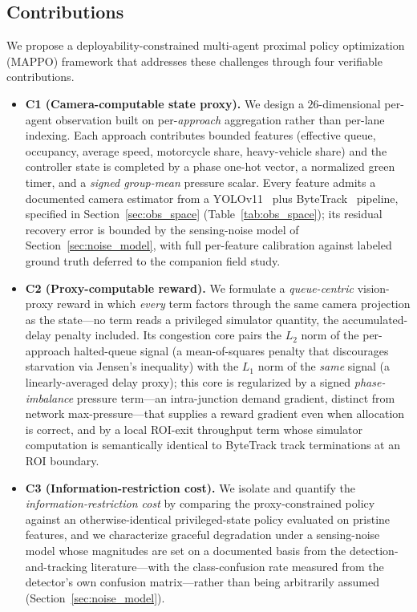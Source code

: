 \subsection{Contributions}
We propose a deployability-constrained multi-agent proximal policy optimization (MAPPO) framework that addresses these challenges through four verifiable contributions.
\begin{itemize}
  \item \textbf{C1 (Camera-computable state proxy).} We design a
  $26$-dimensional per-agent observation built on per-\emph{approach}
  aggregation rather than per-lane indexing. Each approach contributes bounded features (effective queue, occupancy, average speed, motorcycle share, heavy-vehicle share) and the controller state is completed by a phase one-hot vector, a normalized green timer, and a \emph{signed group-mean} pressure scalar. Every feature admits a documented camera estimator from a YOLOv11~\cite{khanam2024_yolov11}
  plus ByteTrack~\cite{zhang2022_bytetrack} pipeline, specified in
  Section~\ref{sec:obs_space} (Table~\ref{tab:obs_space}); its residual recovery error is
  bounded by the sensing-noise model of Section~\ref{sec:noise_model}, with full per-feature
  calibration against labeled ground truth deferred to the companion field study.
  \item \textbf{C2 (Proxy-computable reward).} We formulate a
  \emph{queue-centric} vision-proxy reward
  in which \emph{every} term factors through the same camera projection as the state---no term reads a privileged simulator quantity, the accumulated-delay penalty included. Its congestion core pairs the $L_2$ norm of the per-approach halted-queue signal (a mean-of-squares penalty that discourages starvation via Jensen's inequality) with the $L_1$ norm of the \emph{same} signal (a linearly-averaged delay proxy); this core is regularized by a signed \emph{phase-imbalance} pressure term---an intra-junction demand gradient, distinct from network max-pressure---that supplies a reward gradient even when allocation is correct, and by a local ROI-exit throughput term whose simulator computation is semantically identical to ByteTrack track terminations at an ROI boundary.
  \item \textbf{C3 (Information-restriction cost).} We isolate and quantify the \emph{information-restriction cost} by comparing the proxy-constrained policy against an otherwise-identical privileged-state policy evaluated on pristine features, and we characterize graceful degradation under a sensing-noise model whose magnitudes are set on a documented basis from the detection-and-tracking literature---with the class-confusion rate measured from the detector's own confusion matrix---rather than being arbitrarily assumed (Section~\ref{sec:noise_model}).

\end{itemize}
